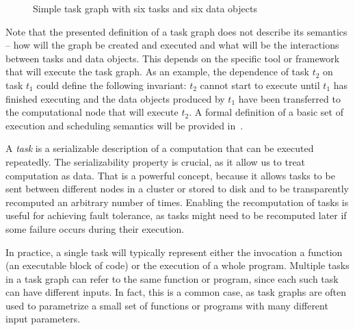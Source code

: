 \begin{figure}[h]
	\centering
	\caption{Simple task graph with six tasks and six data objects}
	\label{fig:task-graph-example}
\end{figure}

Note that the presented definition of a task graph does not describe its semantics -- how will the
graph be created and executed and what will be the interactions between tasks and data objects.
This depends on the specific tool or framework that will execute the task graph. As an example, the
dependence of task $t_2$ on task $t_1$ could define the following
invariant: $t_2$ cannot start to execute until $t_1$ has finished
executing and the data objects produced by $t_1$ have been transferred to the
computational node that will execute $t_2$. A formal definition of a basic set of
execution and scheduling semantics will be provided in~.

A \emph{task} is a serializable description of a computation that can be executed
repeatedly. The serializability property is crucial, as it allow us to treat computation as data.
That is a powerful concept, because it allows tasks to be sent between different nodes in a cluster
or stored to disk and to be transparently recomputed an arbitrary number of times. Enabling the
recomputation of tasks is useful for achieving fault tolerance, as tasks might need to be
recomputed later if some failure occurs during their execution.

In practice, a single task will typically represent either the invocation a function (an executable
block of code) or the execution of a whole program. Multiple tasks in a task graph can refer to the
same function or program, since each such task can have different inputs. In fact, this is a common
case, as task graphs are often used to parametrize a small set of functions or programs with many
different input parameters.

